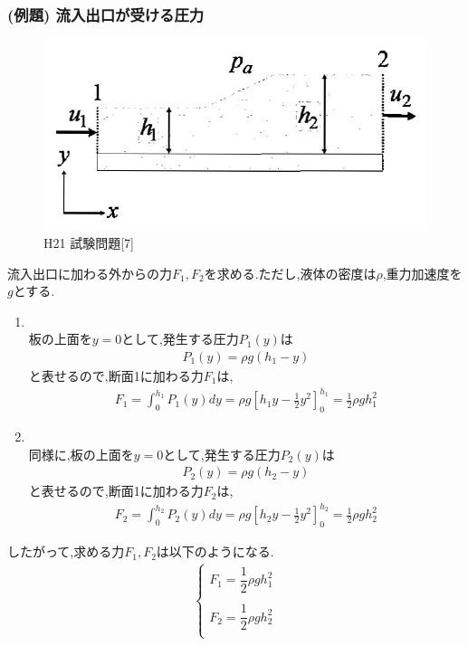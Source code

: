 \documentclass[a4paper]{jsarticle}
\begin{document}
\subsubsection{(例題) 流入出口が受ける圧力}
\begin{figure}[htbp]
    \begin{center}
        \includegraphics[width=120mm]{images/ryuriki_image4.jpg}
        \caption{H21 試験問題[7]}
    \end{center}
\end{figure}
流入出口に加わる外からの力$F_1,F_2$を求める.ただし,液体の密度は$\rho$,重力加速度を$g$とする.
\begin{enumerate}[(1)]
    \item {}\\
          板の上面を$y=0$として,発生する圧力$P_1\left(y\right)$は
          \begin{eqnarray*}
              P_1\left(y\right)=\rho g \left(h_1-y\right)
          \end{eqnarray*}
          と表せるので,断面1に加わる力$F_1$は,
          \begin{eqnarray*}
              F_1=\int_0^{h_1} P_1\left(y\right)dy =\rho g \left[h_1y - \frac{1}{2}y^2\right]_0^{h_1} = \frac{1}{2}\rho g h_1^2
          \end{eqnarray*}
    \item {}\\
          同様に,板の上面を$y=0$として,発生する圧力$P_2\left(y\right)$は
          \begin{eqnarray*}
              P_2\left(y\right)=\rho g \left(h_2-y\right)
          \end{eqnarray*}
          と表せるので,断面1に加わる力$F_2$は,
          \begin{eqnarray*}
              F_2=\int_0^{h_2} P_2\left(y\right)dy =\rho g \left[h_2y - \frac{1}{2}y^2\right]_0^{h_2} = \frac{1}{2}\rho g h_2^2
          \end{eqnarray*}
\end{enumerate}
したがって,求める力$F_1,F_2$は以下のようになる.
\begin{eqnarray*}
    \begin{cases}
        F_1= \dfrac{1}{2}\rho g h_1^2 \\
        \\
        F_2= \dfrac{1}{2}\rho g h_2^2 \\
    \end{cases}
\end{eqnarray*}
\end{document}
